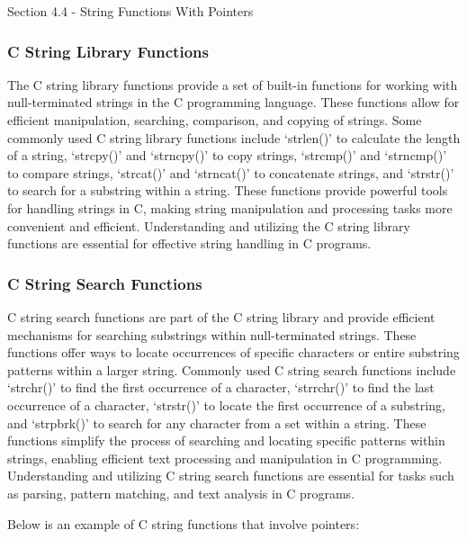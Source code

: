 \begin{notes}{Section 4.4 - String Functions With Pointers}
    \subsubsection*{C String Library Functions}

    The C string library functions provide a set of built-in functions for working with null-terminated strings in the C programming language. These functions allow for efficient manipulation, searching, comparison, and copying of strings. 
    Some commonly used C string library functions include `strlen()' to calculate the length of a string, `strcpy()' and `strncpy()' to copy strings, `strcmp()' and `strncmp()' to compare strings, `strcat()' and `strncat()' to concatenate 
    strings, and `strstr()' to search for a substring within a string. These functions provide powerful tools for handling strings in C, making string manipulation and processing tasks more convenient and efficient. Understanding and utilizing 
    the C string library functions are essential for effective string handling in C programs.
    
    \subsubsection*{C String Search Functions}
    
    C string search functions are part of the C string library and provide efficient mechanisms for searching substrings within null-terminated strings. These functions offer ways to locate occurrences of specific characters or entire substring 
    patterns within a larger string. Commonly used C string search functions include `strchr()' to find the first occurrence of a character, `strrchr()' to find the last occurrence of a character, `strstr()' to locate the first occurrence of a 
    substring, and `strpbrk()' to search for any character from a set within a string. These functions simplify the process of searching and locating specific patterns within strings, enabling efficient text processing and manipulation in C 
    programming. Understanding and utilizing C string search functions are essential for tasks such as parsing, pattern matching, and text analysis in C programs.
    
    \begin{highlight}
        Below is an example of C string functions that involve pointers:
        

\end{highlight}
\end{notes}

